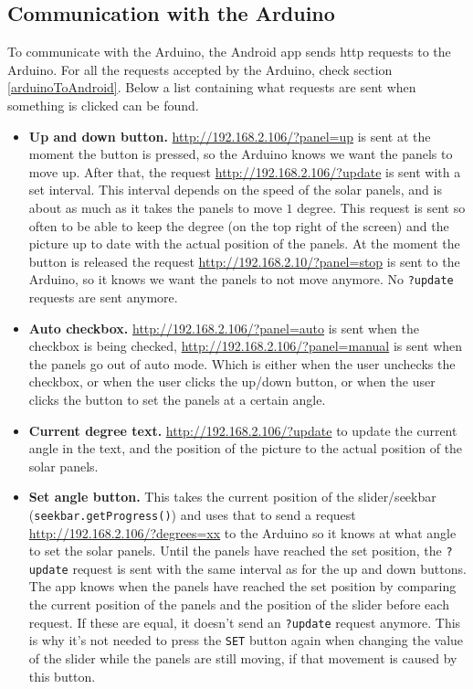 \documentclass{article}
\begin{document}
		\subsection{Communication with the Arduino}
			To communicate with the Arduino, the Android app sends http requests to the Arduino. For all the requests accepted by the Arduino, check section \ref{arduinoToAndroid}. Below a list containing what requests are sent when something is clicked can be found.
			\begin{itemize}
				\item \textbf{Up and down button.} \url{http://192.168.2.106/?panel=up} is sent at the moment the button is pressed, so the Arduino knows we want the panels to move up. After that, the request \url{http://192.168.2.106/?update} is sent with a set interval. This interval depends on the speed of the solar panels, and is about as much as it takes the panels to move $1$ degree. This request is sent so often to be able to keep the degree (on the top right of the screen) and the picture up to date with the actual position of the panels. At the moment the button is released the request \url{http://192.168.2.10/?panel=stop} is sent to the Arduino, so it knows we want the panels to not move anymore. No \verb|?update| requests are sent anymore.
				
				\item \textbf{Auto checkbox.} \url{http://192.168.2.106/?panel=auto} is sent when the checkbox is being checked, \url{http://192.168.2.106/?panel=manual} is sent when the panels go out of auto mode. Which is either when the user unchecks the checkbox, or when the user clicks the up/down button, or when the user clicks the button to set the panels at a certain angle.
				
				\item \textbf{Current degree text.} \url{http://192.168.2.106/?update} to update the current angle in the text, and the position of the picture to the actual position of the solar panels.
				
				\item \textbf{Set angle button.} This takes the current position of the slider/seekbar (\verb|seekbar.getProgress()|) and uses that to send a request \url{http://192.168.2.106/?degrees=xx} to the Arduino so it knows at what angle to set the solar panels. Until the panels have reached the set position, the \verb|?update| request is sent with the same interval as for the up and down buttons. The app knows when the panels have reached the set position by comparing the current position of the panels and the position of the slider before each request. If these are equal, it doesn't send an \verb|?update| request anymore. This is why it's not needed to press the \verb|SET| button again when changing the value of the slider while the panels are still moving, if that movement is caused by this button.
			\end{itemize}
	
\end{document}
